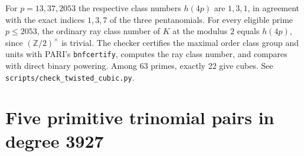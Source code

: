 \documentclass[11pt]{article}
\begin{document}
For \(p=13,37,2053\) the respective class numbers \(h(4p)\) are
\(1,3,1\), in agreement with the exact indices \(1,3,7\) of the
three pentanomials. For every eligible prime \(p\le2053\), the
ordinary ray class number of \(K\) at the modulus \(2\) equals
\(h(4p)\), since \((\mathbb Z/2)^\times\) is trivial.
The checker certifies the maximal order class group and units with
PARI's \texttt{bnfcertify}, computes the ray class number, and
compares with direct binary powering. Among 63 primes, exactly
22 give cubes. See \nolinkurl{scripts/check_twisted_cubic.py}.

\clearpage
\section{Five primitive trinomial pairs in degree 3927}
\label{sec:3927-trinomials}
\end{document}
